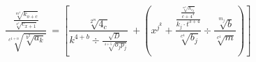 \documentclass[10pt,a4paper,landscape]{article}
\begin{document}
\begin{frame}

\begin{Huge}
$$ \frac{\frac{\sqrt[m^4]{k_{o+c}}}{\sqrt[x^c]{c_{x+1}}}}{\sqrt[c^{1+n}]{\sqrt[b^3]{a_k}}}\ = \left[\frac{\sqrt[2^m]{4_c}}{k^{4+b}\div\frac{\sqrt{D}}{\sqrt[4+5]{o_jp_j}}}\ + \left(x^{j^k}+\frac{\frac{\frac{\sqrt[m^n]{h_{c_d}}}{c+4^3}}{k_j \cdot t^{3+4}}}{\sqrt[c^4]{b_j}}\div\frac{\sqrt[m_j]{b}}{\sqrt[c^4]{m}}\right)\right] $$
\end{Huge}

\end{frame}
\end{document}
